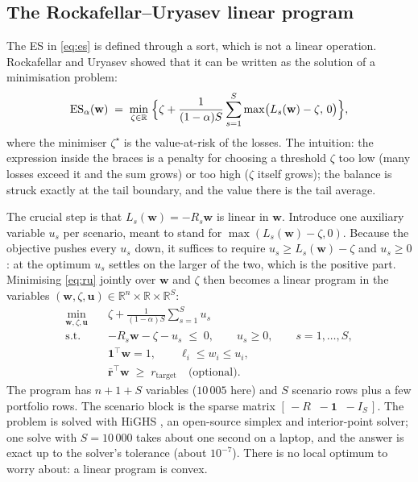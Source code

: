\documentclass[11pt,a4paper]{article}
\newcommand{\ES}{\operatorname{ES}}
\newcommand{\R}{\mathbb{R}}
\newcommand{\w}{\mathbf{w}}
\newcommand{\rr}{\mathbf{r}}
\newcommand{\ones}{\mathbf{1}}
\theoremstyle{plain}
\theoremstyle{remark}
\begin{document}
\subsection{The Rockafellar--Uryasev linear program}

The ES in \eqref{eq:es} is defined through a sort, which is not a linear
operation. Rockafellar and Uryasev \cite{ru2000,ru2002} showed that it can
be written as the solution of a minimisation problem:
\begin{equation}
  \ES_\alpha(\w) \;=\; \min_{\zeta \in \R}\;
  \Bigl\{ \zeta + \frac{1}{(1-\alpha)S} \sum_{s=1}^{S} \max\bigl(L_s(\w) - \zeta,\, 0\bigr) \Bigr\},
  \label{eq:ru}
\end{equation}
where the minimiser $\zeta^\star$ is the value-at-risk of the losses. The
intuition: the expression inside the braces is a penalty for choosing a
threshold $\zeta$ too low (many losses exceed it and the sum grows) or too
high ($\zeta$ itself grows); the balance is struck exactly at the tail
boundary, and the value there is the tail average.

The crucial step is that $L_s(\w) = -R_s\w$ is linear in $\w$. Introduce one
auxiliary variable $u_s$ per scenario, meant to stand for
$\max(L_s(\w) - \zeta, 0)$. Because the objective pushes every $u_s$ down,
it suffices to require $u_s \ge L_s(\w) - \zeta$ and $u_s \ge 0$: at the
optimum $u_s$ settles on the larger of the two, which is the positive part.
Minimising \eqref{eq:ru} jointly over $\w$ and $\zeta$ then becomes a linear
program in the variables $(\w, \zeta, \mathbf u) \in \R^n\times\R\times\R^S$:
\begin{equation}
\begin{aligned}
  \min_{\w,\zeta,\mathbf{u}} \quad & \zeta + \frac{1}{(1-\alpha)S}\sum_{s=1}^{S} u_s \\
  \text{s.t.}\quad & -R_s\w - \zeta - u_s \;\le\; 0, \qquad u_s \ge 0, \qquad s = 1,\dots,S, \\
                   & \ones^\top \w = 1, \qquad \ell_i \le w_i \le u_i, \\
                   & \bar{\rr}^\top \w \;\ge\; r_{\mathrm{target}} \quad \text{(optional)}.
\end{aligned}
\label{eq:lp}
\end{equation}
The program has $n + 1 + S$ variables ($10\,005$ here) and $S$ scenario
rows plus a few portfolio rows. The scenario block is the sparse matrix
$[\,-R \;\; -\ones \;\; -I_S\,]$. The problem is solved with HiGHS
\cite{highs}, an open-source simplex and interior-point solver; one solve
with $S = 10\,000$ takes about one second on a laptop, and the answer is
exact up to the solver's tolerance (about $10^{-7}$). There is no local
optimum to worry about: a linear program is convex.
\end{document}
